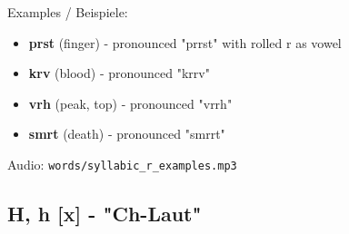 \begin{tcolorbox}[colback=lightyellow!30, colframe=orange, title=\textbf{R, r}]
Examples / Beispiele:
\begin{itemize}
    \item \textbf{prst} (finger) - pronounced "prrst" with rolled r as vowel
    \item \textbf{krv} (blood) - pronounced "krrv"
    \item \textbf{vrh} (peak, top) - pronounced "vrrh"
    \item \textbf{smrt} (death) - pronounced "smrrt"
\end{itemize}

Audio: \texttt{words/syllabic\_r\_examples.mp3}

\end{tcolorbox}

\subsection{H, h [x] - "Ch-Laut"}


